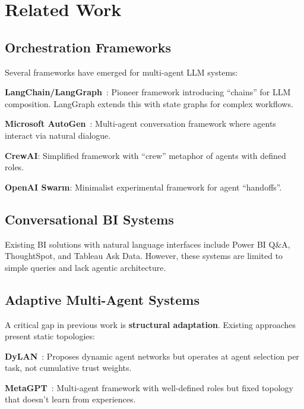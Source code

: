 \documentclass[11pt,a4paper]{article}
\theoremstyle{definition}
\theoremstyle{remark}
\begin{document}

\section{Related Work}
\label{sec:related-work}

\subsection{Orchestration Frameworks}

Several frameworks have emerged for multi-agent LLM systems:

\textbf{LangChain/LangGraph}~\cite{langchain2024}: Pioneer framework introducing ``chains'' for LLM composition. LangGraph extends this with state graphs for complex workflows.

\textbf{Microsoft AutoGen}~\cite{wu2023autogen}: Multi-agent conversation framework where agents interact via natural dialogue.

\textbf{CrewAI}: Simplified framework with ``crew'' metaphor of agents with defined roles.

\textbf{OpenAI Swarm}: Minimalist experimental framework for agent ``handoffs''.

\subsection{Conversational BI Systems}

Existing BI solutions with natural language interfaces include Power BI Q\&A, ThoughtSpot, and Tableau Ask Data. However, these systems are limited to simple queries and lack agentic architecture.

\subsection{Adaptive Multi-Agent Systems}

A critical gap in previous work is \textbf{structural adaptation}. Existing approaches present static topologies:

\textbf{DyLAN}~\cite{liu2024dylan}: Proposes dynamic agent networks but operates at agent selection per task, not cumulative trust weights.

\textbf{MetaGPT}~\cite{hong2023metagpt}: Multi-agent framework with well-defined roles but fixed topology that doesn't learn from experiences.
\end{document}
